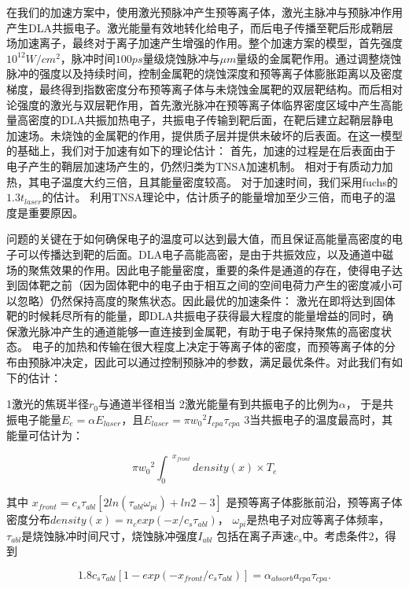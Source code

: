 在我们的加速方案中，使用激光预脉冲产生预等离子体，激光主脉冲与预脉冲作用产生DLA共振电子。激光能量有效地转化给电子，而后电子传播至靶后形成鞘层场加速离子，最终对于离子加速产生增强的作用。整个加速方案的模型，首先强度$10^{12}W/cm^2$，脉冲时间$100ps$量级烧蚀脉冲与$\mu m$量级的金属靶作用。通过调整烧蚀脉冲的强度以及持续时间，控制金属靶的烧蚀深度和预等离子体膨胀距离以及密度梯度，最终得到指数密度分布预等离子体与未烧蚀金属靶的双层靶结构。而后相对论强度的激光与双层靶作用，首先激光脉冲在预等离子体临界密度区域中产生高能量高密度的DLA共振加热电子，共振电子传输到靶后面，在靶后建立起鞘层静电加速场。未烧蚀的金属靶的作用，提供质子层并提供未破坏的后表面。在这一模型的基础上，我们对于加速有如下的理论估计：
首先，加速的过程是在后表面由于电子产生的鞘层加速场产生的，仍然归类为TNSA加速机制。
相对于有质动力加热，其电子温度大约三倍，且其能量密度较高。
对于加速时间，我们采用fuchs的 $1.3 t_{laser}$的估计。 利用TNSA理论中，估计质子的能量增加至少三倍，而电子的温度是重要原因。


问题的关键在于如何确保电子的温度可以达到最大值，而且保证高能量高密度的电子可以传播达到靶的后面。DLA电子高能高密，是由于共振效应，以及通道中磁场的聚焦效果的作用。因此电子能量密度，重要的条件是通道的存在，使得电子达到固体靶之前（因为固体靶中的电子由于相互之间的空间电荷力产生的密度减小可以忽略）仍然保持高度的聚焦状态。因此最优的加速条件：
激光在即将达到固体靶的时候耗尽所有的能量，即DLA共振电子获得最大程度的能量增益的同时，确保激光脉冲产生的通道能够一直连接到金属靶，有助于电子保持聚焦的高密度状态。
电子的加热和传输在很大程度上决定于等离子体的密度，而预等离子体的分布由预脉冲决定，因此可以通过控制预脉冲的参数，满足最优条件。对此我们有如下的估计：

1激光的焦斑半径$r_0$与通道半径相当
2激光能量有到共振电子的比例为$\alpha$， 于是共振电子能量$E_{e} =\alpha E_{laser} $，且$E_{laser}=\pi {w_0}^2 I_{cpa} \tau_{cpa}$
3当共振电子的温度最高时，其能量可估计为：

\begin{equation}
\label{eqn:energyOsilationElectron}
 \pi {w_0}^2 {{\int}_{0}}^{x_{front}} density(x) \times T_e
\end{equation}

其中 $x_{front}=c_s {\tau}_{abl}[2ln({\tau}_{abl} {\omega}_{pi})+ln2-3]$\cite{mora2003plasma}    是预等离子体膨胀前沿，预等离子体密度分布$density(x)=n_c exp(-x/{c_s{\tau}_{abl}})$， ${\omega}_{pi}$是热电子对应等离子体频率， ${\tau}_{abl}$是烧蚀脉冲时间尺寸，烧蚀脉冲强度$I_{abl}$ 包括在离子声速$c_s$中。考虑条件2，得到



\begin{equation*}
\label{eqn:OptimalCondition}

{1.8} c_s {\tau}_{abl}[1-exp(-x_{front}/{c_s{\tau}_{abl}})] 
 = {\alpha}_{absorb} a_{cpa} \tau_{cpa}.

\end{equation*}








